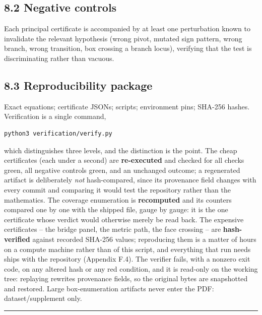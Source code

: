 \subsection{8.2 Negative controls}\label{negative-controls}

Each principal certificate is accompanied by at least one perturbation known to invalidate the relevant hypothesis (wrong pivot, mutated sign pattern, wrong branch, wrong transition, box crossing a branch locus), verifying that the test is discriminating rather than vacuous.

\subsection{8.3 Reproducibility package}\label{reproducibility-package}

Exact equations; certificate JSONs; scripts; environment pins; SHA-256 hashes. Verification is a single command,

\begin{verbatim}
python3 verification/verify.py
\end{verbatim}

which distinguishes three levels, and the distinction is the point. The cheap certificates (each under a second) are \textbf{re-executed} and checked for all checks green, all negative controls green, and an unchanged outcome; a regenerated artifact is deliberately \emph{not} hash-compared, since its provenance field changes with every commit and comparing it would test the repository rather than the mathematics. The coverage enumeration is \textbf{recomputed} and its counters compared one by one with the shipped file, gauge by gauge: it is the one certificate whose verdict would otherwise merely be read back. The expensive certificates -- the bridge panel, the metric path, the face crossing -- are \textbf{hash-verified} against recorded SHA-256 values; reproducing them is a matter of hours on a compute machine rather than of this script, and everything that run needs ships with the repository (Appendix F.4). The verifier fails, with a nonzero exit code, on any altered hash or any red condition, and it is read-only on the working tree: replaying rewrites provenance fields, so the original bytes are snapshotted and restored. Large box-enumeration artifacts never enter the PDF: dataset/supplement only.

\begin{center}\rule{\linewidth}{0.5pt}\end{center}

